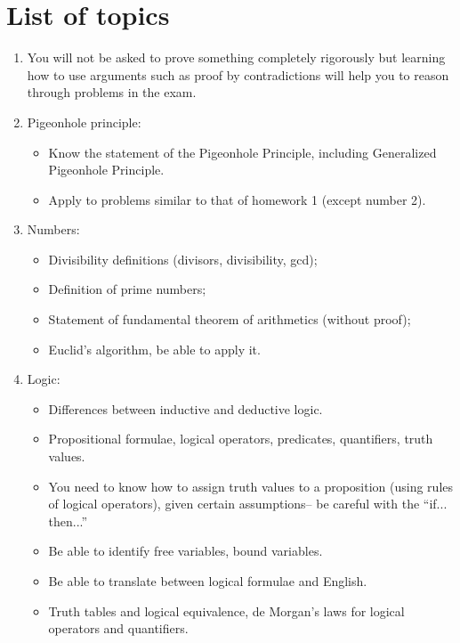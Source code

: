 \documentclass[12pt]{amsart}
\begin{document}
\section*{List of topics}

\begin{enumerate}
    \item You will not be asked to prove something completely rigorously but
    learning how to use arguments such as proof by contradictions will help
    you to reason through problems in the exam.
    \item Pigeonhole principle:
        \begin{itemize}
            \item Know the statement of the Pigeonhole Principle, including Generalized Pigeonhole Principle.
            \item Apply to problems similar to that of homework 1 (except number 2).
        \end{itemize}

    \item Numbers:
        \begin{itemize}
            \item Divisibility definitions (divisors, divisibility, gcd);
            \item Definition of prime numbers;
            \item Statement of fundamental theorem of arithmetics (without proof);
            \item Euclid's algorithm, be able to apply it.
        \end{itemize}

    \item Logic:
        \begin{itemize}
            \item Differences between inductive and deductive logic.
            \item Propositional formulae, logical operators, predicates, quantifiers, truth values.
            \item You need to know how to assign truth values to a proposition 
                (using rules of logical operators),
                given certain assumptions-- be careful with the ``if... then...''
            \item Be able to identify free variables, bound variables. 
            \item Be able to translate between logical formulae and English.
            \item Truth tables and logical equivalence, de Morgan's laws for logical operators and quantifiers.
        \end{itemize}
\end{enumerate}
\end{document}
